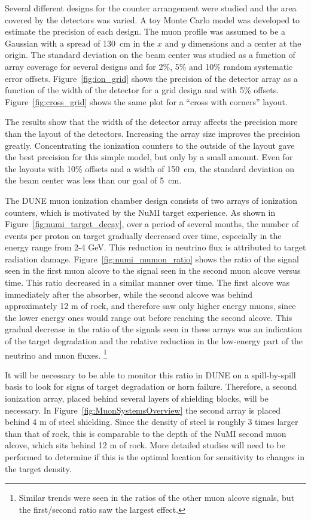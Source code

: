 Several different designs for the counter arrangement were studied and the
area covered by the detectors was varied. A toy Monte Carlo model was
developed to estimate the precision of each design. The muon profile
was assumed to be a Gaussian with a spread of 130~cm in the $x$ and $y$
dimensions and a center at the origin. 
The standard deviation on the beam center was studied as a
function of array coverage for several designs and for 2\%, 5\% and
10\% random systematic error offsets. Figure~\ref{fig:ion_grid} shows the
precision of the detector array as a function of the width of the
detector for a grid design and with 5\%
offsets. Figure~\ref{fig:cross_grid} shows the same plot for a
``cross with corners'' layout.



The results show that the width of the detector array affects the
precision more than the layout of the detectors. Increasing the array
size improves the precision greatly. Concentrating the ionization
counters to the outside of the layout gave the best precision for this
simple model, but only by a small amount. Even for the layouts with
10\% offsets and a width of 150~cm, the standard deviation on the beam
center was less than our goal of 5~cm.

The DUNE muon ionization chamber design consists of two arrays of 
ionization counters, which is motivated by the NuMI target experience.  As shown in Figure~\ref{fig:numi_target_decay}, over a period of several months, the number of events per proton on target gradually decreased over time, especially in the energy range from 2-4 GeV.  
This reduction in neutrino flux is attributed to 
target radiation damage.  Figure~\ref{fig:numi_mumon_ratio} shows the ratio of the signal seen  in the first muon alcove to the signal seen in the second muon alcove versus time.  This ratio decreased in a similar manner over time.  
The first alcove was immediately after the absorber, while the second alcove was behind approximately 12 m of rock, and therefore saw only higher energy muons, since the lower energy ones would range out before reaching the second alcove.  
This gradual decrease in the ratio of the signals seen in these arrays was an indication of the target degradation and the relative reduction in the 
low-energy part of the neutrino and muon fluxes.  \footnote{Similar trends were seen in the ratios of the other muon alcove signals, but the first/second ratio saw the largest effect.}

It will be necessary to be able to monitor this ratio in DUNE on a spill-by-spill basis to look for signs of target degradation or horn failure.  
Therefore, a second ionization array, placed behind several layers of 
shielding blocks, will be necessary.  In Figure~\ref{fig:MuonSystemsOverview}
the second array is placed behind 4 m of steel shielding.  Since the density of steel is roughly 3 times larger than that of rock, this is comparable to the depth of the NuMI second muon alcove, which sits behind 12 m of rock.  More detailed studies will need to be performed to determine if this is the optimal location for sensitivity to changes in the target density.


